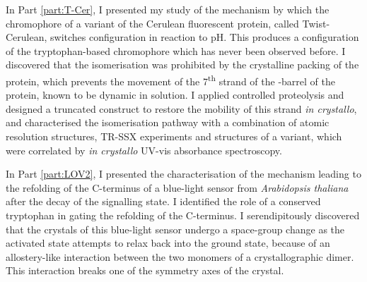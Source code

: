 \documentclass{report}
\begin{document}
In Part \ref{part:T-Cer}, I presented my study of the mechanism by which the chromophore of a variant of the Cerulean fluorescent protein, called Twist-Cerulean, switches configuration in reaction to pH. This produces a configuration of the tryptophan-based chromophore which has never been observed before. I discovered that the isomerisation was prohibited by the crystalline packing of the protein, which prevents the movement of the 7\textsuperscript{th} strand of the \textbeta-barrel of the protein, known to be dynamic in solution. I applied controlled proteolysis and designed a truncated construct to restore the mobility of this strand \textit{in crystallo}, and characterised the isomerisation pathway with a combination of atomic resolution structures, TR-SSX experiments and structures of a variant, which were correlated by \textit{in crystallo} UV-vis absorbance spectroscopy. 

In Part \ref{part:LOV2}, I presented the characterisation of the mechanism leading to the refolding of the C-terminus of a blue-light sensor from \textit{Arabidopsis thaliana} after the decay of the signalling state. I identified the role of a conserved tryptophan in gating the refolding of the C-terminus. I serendipitously discovered that the crystals of this blue-light sensor undergo a space-group change as the activated state attempts to relax back into the ground state, because of an allostery-like interaction between the two monomers of a crystallographic dimer. This interaction breaks one of the symmetry axes of the crystal. 
\end{document}
